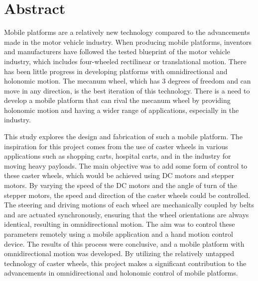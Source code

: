 \section*{Abstract}
\label{sec:abstract}

Mobile platforms are a relatively new technology compared to the advancements made in the motor vehicle industry. When producing mobile platforms, inventors and manufacturers have followed the tested blueprint of the motor vehicle industry, which includes four-wheeled rectilinear or translational motion. There has been little progress in developing platforms with omnidirectional and holonomic motion. The mecanum wheel, which has 3 degrees of freedom and can move in any direction, is the best iteration of this technology. There is a need to develop a mobile platform that can rival the mecanum wheel by providing holonomic motion and having a wider range of applications, especially in the industry.
\par
This study explores the design and fabrication of such a mobile platform. The inspiration for this project comes from the use of caster wheels in various applications such as shopping carts, hospital carts, and in the industry for moving heavy payloads. The main objective was to add some form of control to these caster wheels, which would be achieved using \ac{DC} motors and stepper motors. By varying the speed of the \ac{DC} motors and the angle of turn of the stepper motors, the speed and direction of the caster wheels could be controlled. The steering and driving motions of each wheel are mechanically coupled by belts and are actuated synchronously, ensuring that the wheel orientations are always identical, resulting in omnidirectional motion. The aim was to control these parameters remotely using a mobile application and a hand motion control device. The results of this process were conclusive, and a mobile platform with omnidirectional motion was developed. By utilizing the relatively untapped technology of caster wheels, this project makes a significant contribution to the advancements in omnidirectional and holonomic control of mobile platforms.


